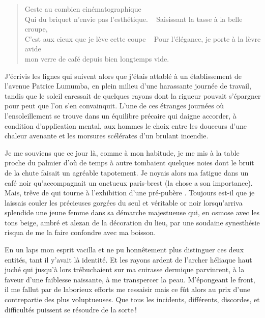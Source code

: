\begin{verse}
Geste au combien cinématographique\\
Qui du briquet n’envie pas l’esthétique.
 
Saisissant la tasse à la belle croupe,\\
C’est aux cieux que je lève cette coupe
 
Pour l’élégance, je porte à la lèvre avide\\
mon verre de café depuis bien longtemps vide.
\end{verse}

\begin{prose}
J’écrivis les lignes qui suivent alors que j’étais attablé à un établissement de l’avenue Patrice Lumumba, en plein milieu d’une harassante journée de travail, tandis que le soleil caressait de quelques rayons dont la rigueur pouvait s’épargner pour peut que l’on s’en convainquit.
L’une de ces étranges journées où l’ensoleillement se trouve dans un équilibre précaire qui daigne accorder, à condition d’application mental, aux hommes le choix entre les douceurs d’une chaleur avenante et les morsures scélérates d’un brulant incendie.

Je me souviens que ce jour là, comme à mon habitude, je me mis à la table proche du palmier d’où de temps à autre tombaient quelques noies dont le bruit de la chute faisait un agréable tapotement. Je noyais alors ma fatigue dans un café noir qu’accompagnait un onctueux paris-brest (la chose a son importance). Mais, trêve de  qui tourne à l’exhibition d’une  pré-pubère . Toujours est-il que je laissais couler les précieuses gorgées du seul et véritable or noir lorsqu’arriva splendide une jeune femme dans sa démarche majestueuse qui, en osmose avec les tons beige, ambré et alezan de la décoration du lieu, par une soudaine synesthésie risqua de me la faire confondre avec ma boisson.

En un laps mon esprit vacilla et ne pu honnêtement plus distinguer ces deux entités, tant il y’avait là identité. Et les rayons ardent de l’archer héliaque haut juché qui jusqu’à lors trébuchaient sur ma cuirasse dermique parvinrent, à la faveur d’une faiblesse naissante, à me transpercer la peau. M’épongeant le front, il me fallut par de laborieux efforts me ressaisir mais ce fût alors au prix d’une contrepartie des plus voluptueuses. Que tous les incidents, différents, discordes, et difficultés puissent se résoudre de la sorte\,!


\end{prose}
